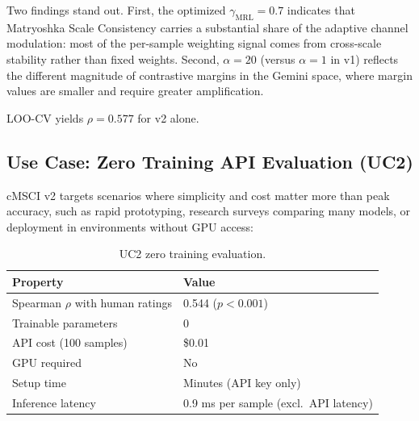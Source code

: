 
Two findings stand out. First, the optimized $\gamma_{\mathrm{MRL}} = 0.7$ indicates that Matryoshka Scale Consistency carries a substantial share of the adaptive channel modulation: most of the per-sample weighting signal comes from cross-scale stability rather than fixed weights. Second, $\alpha = 20$ (versus $\alpha = 1$ in v1) reflects the different magnitude of contrastive margins in the Gemini space, where margin values are smaller and require greater amplification.

LOO-CV yields $\rho = 0.577$ for v2 alone.

\subsection{Use Case: Zero Training API Evaluation (UC2)}\label{sec:uc2}

cMSCI v2 targets scenarios where simplicity and cost matter more than peak accuracy, such as rapid prototyping, research surveys comparing many models, or deployment in environments without GPU access:

\begin{table}[t]
\caption{UC2 zero training evaluation.}\label{tab:uc2}
\centering
\begin{tabular}{ll}
\toprule
Property & Value \\
\midrule
Spearman $\rho$ with human ratings & 0.544 ($p < 0.001$) \\
Trainable parameters & 0 \\
API cost (100 samples) & \$0.01 \\
GPU required & No \\
Setup time & Minutes (API key only) \\
Inference latency & 0.9 ms per sample (excl.\ API latency) \\
\bottomrule
\end{tabular}
\end{table}


